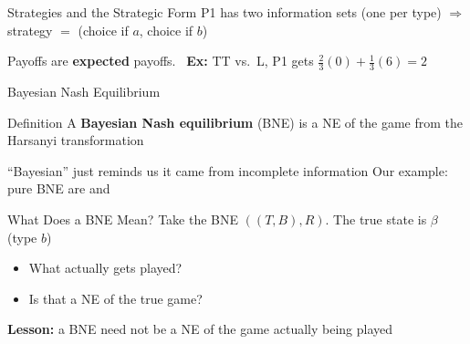 \begin{frame}{Strategies and the Strategic Form}
P1 has two information sets (one per type) $\Rightarrow$ strategy $=$ (choice if $a$, choice if $b$)
\bsk
\centering
{}%
\bsk
\raggedright
Payoffs are \textbf{expected} payoffs. \ \textbf{Ex:} TT vs.\ L, P1 gets $\tfrac23(0)+\tfrac13(6)=2$\\[4pt]
\vspace{-0.3in}
\end{frame}

\begin{frame}{Bayesian Nash Equilibrium}
\begin{block}{Definition}
A \textbf{Bayesian Nash equilibrium} (BNE) is a NE of the game from the Harsanyi transformation
\end{block}
\bsk
``Bayesian'' just reminds us it came from incomplete information
\bsk
Our example: pure BNE are \underline{\hspace{1.1in}} and \underline{\hspace{1.1in}}
\bsk
{}
\vspace{-0.3in}
\end{frame}

\begin{frame}{What Does a BNE Mean?}
Take the BNE $((T,B),R)$. The true state is $\beta$ (type $b$)
\begin{itemize}
    \item What actually gets played? \underline{\hspace{0.8in}}
    \item Is that a NE of the true game? \underline{\hspace{0.8in}}
\end{itemize}
\bsk
\textbf{Lesson:} a BNE need not be a NE of the game actually being played
\bsk
{}
\vspace{-0.3in}
\end{frame}


